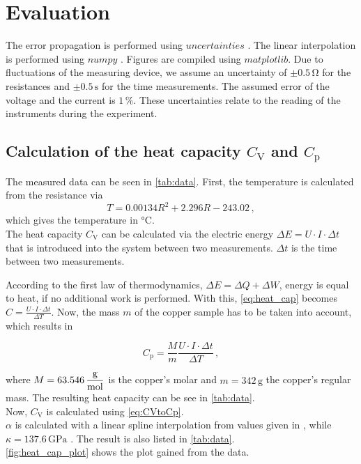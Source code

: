 \section{Evaluation}
\label{sec:Auswertung}



The error propagation is performed using $uncertainties$ \cite{unp}. The linear interpolation is performed using $numpy$ \cite{numpy}.
Figures are compiled using $matplotlib$\cite{Hunter:2007}. Due to fluctuations of the measuring device, we assume an uncertainty of
$\pm 0.5 \, \unit{\ohm}$ for the resistances and $\pm 0.5 \, \unit{\second} $ for the time measurements. 
The assumed error of the voltage and the current is $1 \, \%$. 
These uncertainties relate to the reading of the instruments during the experiment.

\subsection{Calculation of the heat capacity $C_\text{V}$ and $C_\text{p}$}
\label{subsec:CVaCp}

The measured data can be seen in \autoref{tab:data}. First, the temperature is calculated from the resistance via 
\begin{equation*}
    \label{eq:RtoT}
    T = 0.00134 R^2 + 2.296 R - 243.02 \,,
\end{equation*}
which gives the temperature in $\unit{\celsius}$. \\

The heat capacity $C_\text{V}$ can be calculated via the electric energy $\Delta E = U \cdot I \cdot \Delta t $ that is introduced into the system between two measurements.
$\Delta t$ is the time between two measurements.

According to the first law of thermodynamics, $\Delta E = \Delta Q + \Delta W$, energy is equal to heat, if no additional work is performed.
With this, \eqref{eq:heat_cap} becomes $C = \frac{U \cdot I \cdot \Delta t}{\Delta T}$. Now, the mass $m$ of the copper sample has to be taken into account,
which results in 

\begin{equation*}
    C_\text{p} = \dfrac{M}{m} \frac{U \cdot I \cdot \Delta t}{\Delta T} \,,
\end{equation*}

where $M = 63.546\, \unit{\dfrac{\gram}{\mol}}$\cite{Jefflab} is the copper's molar and $m = 342 \,\unit{\gram}$ \cite{v47} the copper's regular mass.
The resulting heat capacity can be see in \autoref{tab:data}. \\
Now, $C_\text{V} $ is calculated using \eqref{eq:CVtoCp}. \\
$\alpha $ is calculated with a linear spline interpolation from values given in \cite{v47}, while $\kappa = 137.6 \, \unit{\giga\pascal} $ \cite{KO202193}.
The result is also listed in \autoref{tab:data}. \\
\autoref{fig:heat_cap_plot} shows the plot gained from the data.


